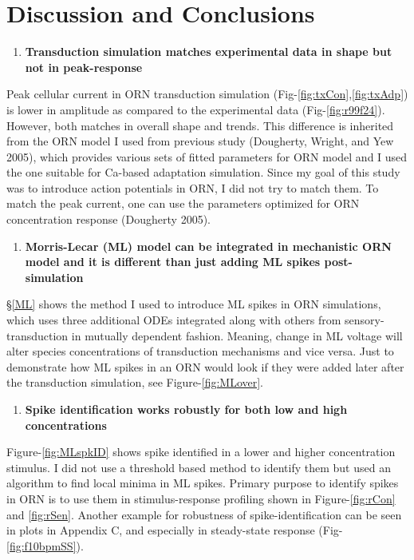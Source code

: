\documentclass[
]{article}
\providecommand{\tightlist}{%
  \setlength{\itemsep}{0pt}\setlength{\parskip}{0pt}}
\begin{document}
\hypertarget{CD}{%
\section{Discussion and Conclusions}\label{CD}}

\begin{enumerate}
\def\labelenumi{\Alph{enumi}.}
\tightlist
\item
  \textbf{Transduction simulation matches experimental data in shape but not in peak-response}
\end{enumerate}

Peak cellular current in ORN transduction simulation (Fig-\ref{fig:txCon},\ref{fig:txAdp}) is lower in amplitude as compared to the experimental data (Fig-\ref{fig:r99f24}). However, both matches in overall shape and trends. This difference is inherited from the ORN model I used from previous study (Dougherty, Wright, and Yew 2005), which provides various sets of fitted parameters for ORN model and I used the one suitable for Ca-based adaptation simulation. Since my goal of this study was to introduce action potentials in ORN, I did not try to match them. To match the peak current, one can use the parameters optimized for ORN concentration response (Dougherty 2005).

\begin{enumerate}
\def\labelenumi{\Alph{enumi}.}
\setcounter{enumi}{1}
\tightlist
\item
  \textbf{Morris-Lecar (ML) model can be integrated in mechanistic ORN model and it is different than just adding ML spikes post-simulation}
\end{enumerate}

\S\ref{ML} shows the method I used to introduce ML spikes in ORN simulations, which uses three additional ODEs integrated along with others from sensory-transduction in mutually dependent fashion. Meaning, change in ML voltage will alter species concentrations of transduction mechanisms and vice versa. Just to demonstrate how ML spikes in an ORN would look if they were added later after the transduction simulation, see Figure-\ref{fig:MLover}.

\begin{enumerate}
\def\labelenumi{\Alph{enumi}.}
\setcounter{enumi}{2}
\tightlist
\item
  \textbf{Spike identification works robustly for both low and high concentrations}
\end{enumerate}

Figure-\ref{fig:MLspkID} shows spike identified in a lower and higher concentration stimulus. I did not use a threshold based method to identify them but used an algorithm to find local minima in ML spikes. Primary purpose to identify spikes in ORN is to use them in stimulus-response profiling shown in Figure-\ref{fig:rCon} and \ref{fig:rSen}. Another example for robustness of spike-identification can be seen in plots in Appendix C, and especially in steady-state response (Fig-\ref{fig:f10bpmSS}).
\end{document}
